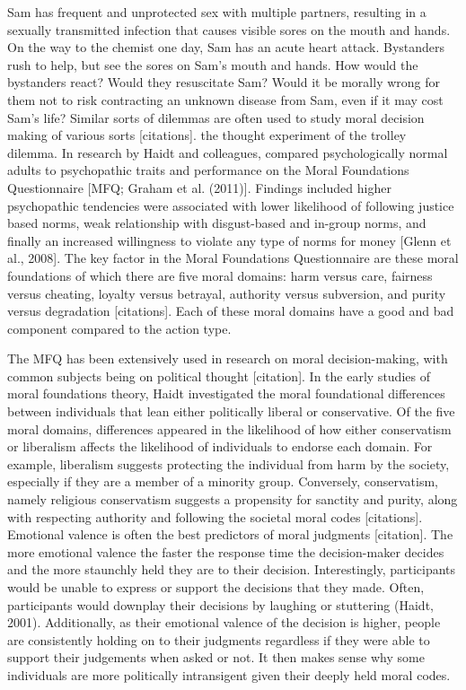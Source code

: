 \documentclass[
  donotrepeattitle,doc, 12pt, a4paper,floatsintext]{apa7}
\begin{document}
Sam has frequent and unprotected sex with multiple partners, resulting in a sexually transmitted infection that causes visible sores on the mouth and hands. On the way to the chemist one day, Sam has an acute heart attack. Bystanders rush to help, but see the sores on Sam's mouth and hands. How would the bystanders react? Would they resuscitate Sam? Would it be morally wrong for them not to risk contracting an unknown disease from Sam, even if it may cost Sam's life? Similar sorts of dilemmas are often used to study moral decision making of various sorts {[}citations{]}. the thought experiment of the trolley dilemma. In research by Haidt and colleagues, compared psychologically normal adults to psychopathic traits and performance on the Moral Foundations Questionnaire {[}MFQ; Graham et al. (2011){]}. Findings included higher psychopathic tendencies were associated with lower likelihood of following justice based norms, weak relationship with disgust-based and in-group norms, and finally an increased willingness to violate any type of norms for money {[}Glenn et al., 2008{]}. The key factor in the Moral Foundations Questionnaire are these moral foundations of which there are five moral domains: harm versus care, fairness versus cheating, loyalty versus betrayal, authority versus subversion, and purity versus degradation {[}citations{]}. Each of these moral domains have a good and bad component compared to the action type.

The MFQ has been extensively used in research on moral decision-making, with common subjects being on political thought {[}citation{]}. In the early studies of moral foundations theory, Haidt investigated the moral foundational differences between individuals that lean either politically liberal or conservative. Of the five moral domains, differences appeared in the likelihood of how either conservatism or liberalism affects the likelihood of individuals to endorse each domain. For example, liberalism suggests protecting the individual from harm by the society, especially if they are a member of a minority group. Conversely, conservatism, namely religious conservatism suggests a propensity for sanctity and purity, along with respecting authority and following the societal moral codes {[}citations{]}. Emotional valence is often the best predictors of moral judgments {[}citation{]}. The more emotional valence the faster the response time the decision-maker decides and the more staunchly held they are to their decision. Interestingly, participants would be unable to express or support the decisions that they made. Often, participants would downplay their decisions by laughing or stuttering (Haidt, 2001). Additionally, as their emotional valence of the decision is higher, people are consistently holding on to their judgments regardless if they were able to support their judgements when asked or not. It then makes sense why some individuals are more politically intransigent given their deeply held moral codes.
\end{document}
